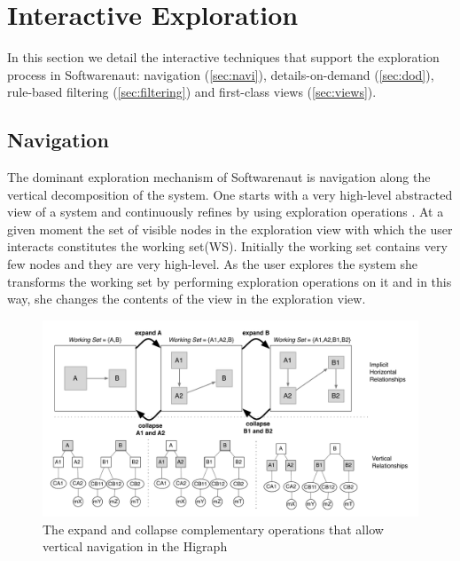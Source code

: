 \documentclass[preprint,12pt]{elsarticle}
\begin{document}
\section {Interactive Exploration}
\label {sec:interact}

In this section we detail the interactive techniques that support the exploration process in Softwarenaut: 
navigation (\ref{sec:navi}), 
details-on-demand (\ref{sec:dod}),
rule-based filtering (\ref{sec:filtering}) and
first-class views (\ref{sec:views}).  

\subsection{Navigation}

The dominant exploration mechanism of Softwarenaut is navigation along the vertical decomposition of the system. One starts with a very high-level abstracted view of a system and continuously refines by using exploration operations \cite{robertson-conetrees}. At a given moment the set of visible nodes in the exploration view with which the user interacts constitutes the working set(WS). Initially the working set contains very few nodes and they are very high-level. As the user explores the system she transforms the working set by performing exploration operations on it and in this way, she changes the contents of the view in the exploration view.


\begin{figure}[b!]
\begin{center}
\includegraphics[width=\linewidth]{SnautSequence}
\caption{The expand and collapse complementary operations that allow vertical navigation in the Higraph}
\label{}
\end{center}
\end{figure}
\end{document}
